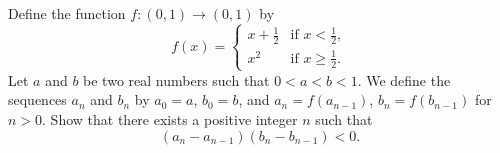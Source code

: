Define the function $f \colon (0,1) \to (0,1)$ by
\[ f(x) = \begin{cases} x + \frac{1}{2} & \text{if } x < \frac{1}{2}, \\ x^2 & \text{if } x \geq \frac{1}{2}. \end{cases} \]
Let $a$ and $b$ be two real numbers such that $0 < a < b < 1$. We define the sequences $a_n$ and $b_n$ by $a_0 = a$, $b_0 = b$, and $a_n = f(a_{n-1})$, $b_n = f(b_{n-1})$ for $n > 0$. Show that there exists a positive integer $n$ such that
\[ (a_n - a_{n-1})(b_n - b_{n-1}) < 0. \]
